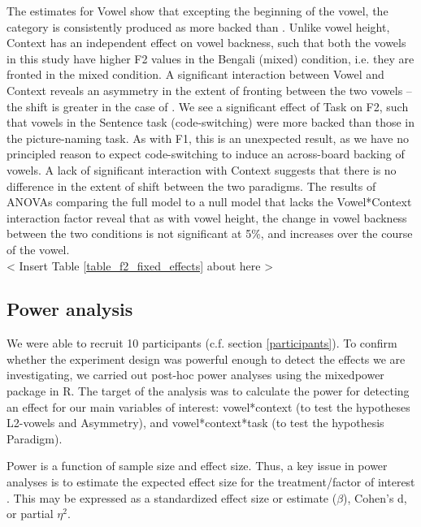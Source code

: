 \documentclass[12 pt]{article}
\newcommand{\nt}[1]{\textipa{[#1]}} %
\begin{document}
The estimates for Vowel show that excepting the beginning of the vowel, the category \nt{2} is consistently produced as more backed than \nt{\ae}. Unlike vowel height, Context has an independent effect on vowel backness, such that both the vowels in this study have higher F2 values in the Bengali (mixed) condition, i.e. they are fronted in the mixed condition. A significant interaction between Vowel and Context reveals an asymmetry in the extent of fronting between the two vowels -- the shift is greater in the case of \nt{\ae}. We see a significant effect of Task on F2, such that vowels in the Sentence task (code-switching) were more backed than those in the picture-naming task. As with F1, this is an unexpected result, as we have no principled reason to expect code-switching to induce an across-board backing of vowels. A lack of significant interaction with Context suggests that there is no difference in the extent of shift between the two paradigms. The results of ANOVAs comparing the full model to a null model that lacks the Vowel*Context interaction factor reveal that as with vowel height, the change in vowel backness between the two conditions is not significant at 5\%, and increases over the course of the vowel.\\

< Insert Table \ref{table_f2_fixed_effects} about here >

\subsection{Power analysis}
We were able to recruit 10 participants (c.f. section \ref{participants}). To confirm whether the experiment design was powerful enough to detect the effects we are investigating, we carried out post-hoc power analyses using the mixedpower package \citep{kumle2021estimating} in R. The target of the analysis was to calculate the power for detecting an effect for our main variables of interest: vowel*context (to test the hypotheses L2-vowels and Asymmetry), and vowel*context*task (to test the hypothesis Paradigm). 

Power is a function of sample size and effect size. Thus, a key issue in power analyses is to estimate the expected effect size for the treatment/factor of interest \citep{brysbaert2018power, kumle2021estimating}. This may be expressed as a standardized effect size or estimate ($\beta$), Cohen's d, or partial $\eta ^2$. 
\end{document}
